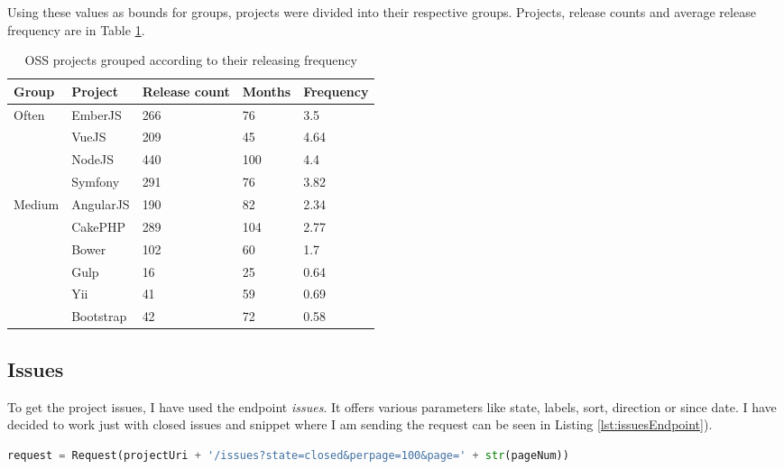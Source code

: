 Using these values as bounds for groups, projects were divided into their respective groups. Projects, release counts and average release frequency are in Table \ref{table:releaseGroupsCalculation}.

\begin{table}[H]
\centering
\begin{tabular}{| p{2cm}|p{2cm}|p{2.8cm}|p{1.8cm}|p{2cm}|}
 \hline
\textbf{Group} & \textbf{ Project }& \textbf{Release count} & \textbf{ Months }& \textbf{Frequency}\\
 \hline
  \multirow{4}{*}{Often}   & EmberJS & 266   & 76 & 3.5\\ 
    & VueJS &  209 & 45 & 4.64 \\ 
    & NodeJS & 440 & 100 & 4.4\\  
    & Symfony & 291 & 76 & 3.82\\ \hline 
  \multirow{4}{*}{Medium}   & AngularJS & 190   & 82 & 2.34\\ 
    & CakePHP & 289 & 104 & 2.77\\ 
    & Bower &  102 & 60 & 1.7\\   \hline 
  \multirow{4}{*}{Seldom}   & Gulp & 16 & 25 & 0.64\\ 
    & Yii & 41 & 59 & 0.69\\ 
    & Bootstrap &  42 & 72 & 0.58\\  \hline 
\end{tabular}
\caption{OSS projects grouped according to their releasing frequency}
\label{table:releaseGroupsCalculation}
\end{table}


\subsection{Issues} \label{ssec:issuesMining}
To get the project issues, I have used the endpoint \textit{issues}. It offers various parameters like state, labels, sort, direction or since date. I have decided to work just with closed issues and snippet where I am sending the request can be seen in Listing \ref{lst:issuesEndpoint}).

\begin{lstlisting}[caption={Requesting 100 closed issues},label={lst:issuesEndpoint},language=Python]
request = Request(projectUri + '/issues?state=closed&perpage=100&page=' + str(pageNum))
\end{lstlisting}

